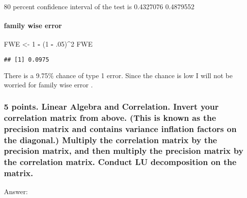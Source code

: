 \documentclass[]{article}
\newenvironment{Shaded}{\begin{snugshade}}{\end{snugshade}}
\newcommand{\CommentTok}[1]{\textcolor[rgb]{0.56,0.35,0.01}{\textit{#1}}}
\newcommand{\DecValTok}[1]{\textcolor[rgb]{0.00,0.00,0.81}{#1}}
\newcommand{\FloatTok}[1]{\textcolor[rgb]{0.00,0.00,0.81}{#1}}
\newcommand{\KeywordTok}[1]{\textcolor[rgb]{0.13,0.29,0.53}{\textbf{#1}}}
\newcommand{\NormalTok}[1]{#1}
\newcommand{\OperatorTok}[1]{\textcolor[rgb]{0.81,0.36,0.00}{\textbf{#1}}}
\newcommand{\StringTok}[1]{\textcolor[rgb]{0.31,0.60,0.02}{#1}}
\let\oldparagraph\paragraph
\renewcommand{\paragraph}[1]{\oldparagraph{#1}\mbox{}}
\begin{document}
80 percent confidence interval of the test is 0.4327076 0.4879552

\hypertarget{family-wise-error}{%
\paragraph{family wise error}\label{family-wise-error}}

\begin{Shaded}
\begin{Highlighting}[]
\NormalTok{FWE <-}\StringTok{ }\DecValTok{1} \OperatorTok{-}\StringTok{ }\NormalTok{(}\DecValTok{1} \OperatorTok{-}\StringTok{ }\FloatTok{.05}\NormalTok{)}\OperatorTok{^}\DecValTok{2} 
\NormalTok{FWE}
\end{Highlighting}
\end{Shaded}

\begin{verbatim}
## [1] 0.0975
\end{verbatim}

There is a 9.75\% chance of type 1 error. Since the chance is low I will
not be worried for family wise error .

\hypertarget{points.-linear-algebra-and-correlation.-invert-your-correlation-matrix-from-above.-this-is-known-as-the-precision-matrix-and-contains-variance-inflation-factors-on-the-diagonal.-multiply-the-correlation-matrix-by-the-precision-matrix-and-then-multiply-the-precision-matrix-by-the-correlation-matrix.-conduct-lu-decomposition-on-the-matrix.}{%
\subsubsection{5 points. Linear Algebra and Correlation. Invert your
correlation matrix from above. (This is known as the precision matrix
and contains variance inflation factors on the diagonal.) Multiply the
correlation matrix by the precision matrix, and then multiply the
precision matrix by the correlation matrix. Conduct LU decomposition on
the
matrix.}\label{points.-linear-algebra-and-correlation.-invert-your-correlation-matrix-from-above.-this-is-known-as-the-precision-matrix-and-contains-variance-inflation-factors-on-the-diagonal.-multiply-the-correlation-matrix-by-the-precision-matrix-and-then-multiply-the-precision-matrix-by-the-correlation-matrix.-conduct-lu-decomposition-on-the-matrix.}}

Answer:

\begin{Shaded}
\end{Shaded}
\end{document}
